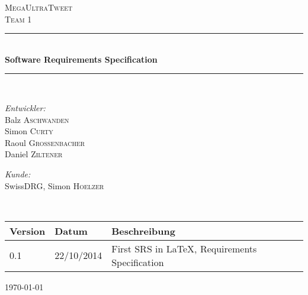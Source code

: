 \begin{titlepage}
\begin{center}



\textsc{\LARGE MegaUltraTweet}\\[1.0cm]
\textsc{\Large Team 1}\\[1.5cm]
\newcommand{\HRule}{\rule{\linewidth}{0.5mm}}
\HRule \\[0.4cm]
{ \huge \bfseries Software Requirements Specification}\\[0.4cm]

\HRule \\[1.5cm]

\begin{minipage}{0.4\textwidth}
\begin{flushleft} \large
\emph{Entwickler:}\\
Balz \textsc{Aschwanden}\\
Simon \textsc{Curty}\\
Raoul \textsc{Grossenbacher}\\
Daniel \textsc{Ziltener}
\end{flushleft}
\end{minipage}
\hfill
\begin{minipage}{0.4\textwidth}
\begin{flushright} \large
\emph{Kunde:} \\
SwissDRG, Simon \textsc{Hoelzer}
\end{flushright}
\end{minipage}
\\[1.5cm]
\begin{tabular}{|l|l|l|}
\hline
\textbf{Version}&\textbf{Datum}&\textbf{Beschreibung}\\ \hline
0.1 & 22/10/2014 & First SRS in LaTeX, Requirements Specification \\ \hline
\end{tabular}

\vfill

{\large \today}

\end{center}

\end{titlepage}
